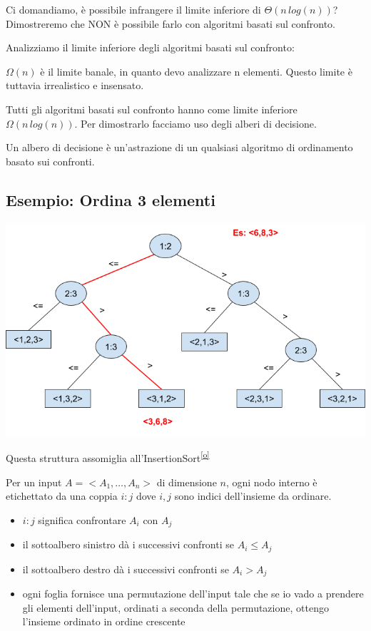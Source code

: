 \documentclass[11pt,a4paper,twoside,openright]{book}
\providecommand{\tightlist}{\setlength{\itemsep}{0pt}\setlength{\parskip}{0pt}}
\begin{document}
{Ci domandiamo, è possibile infrangere il limite inferiore di $\Theta(n\,log(n))$? Dimostreremo che NON è possibile farlo con algoritmi basati sul confronto.}

{Analizziamo il limite inferiore degli algoritmi basati sul confronto:}

{$\Omega(n)$ è il limite banale, in quanto devo analizzare n elementi. Questo limite è tuttavia irrealistico e insensato.}

{Tutti gli algoritmi basati sul confronto hanno come limite inferiore $\Omega(n\,log(n))$. Per dimostrarlo facciamo uso degli alberi di decisione.}

{Un albero di decisione è un'astrazione di un qualsiasi algoritmo di ordinamento basato sui confronti.}

\subsection{Esempio: Ordina 3 elementi}

{\includegraphics{images/image531.png}}

{Questa struttura assomiglia all'InsertionSort}\textsuperscript{\protect\hyperlink{cmnt15}{{[}o{]}}}

{Per un input $A = <A_1,\ldots,A_n>$ di dimensione $n$, ogni nodo interno è etichettato da una coppia $i:j$ dove $i,j$ sono indici dell'insieme da ordinare.}

\begin{itemize}
\tightlist
\item
  {$i:j$ significa confrontare $A_i$ con $A_j$}
\item
  {il sottoalbero sinistro dà i successivi confronti se $A_i \leq A_j$}
\item
  {il sottoalbero destro dà i successivi confronti se $A_i > A_j$}
\item
  {ogni foglia fornisce una permutazione dell'input tale che se io vado a prendere gli elementi dell'input, ordinati a seconda della permutazione, ottengo l'insieme ordinato in ordine crescente}
\end{itemize}
\end{document}
